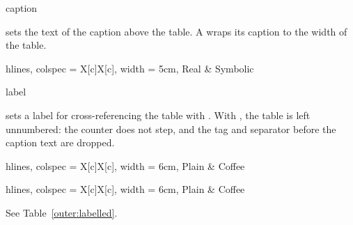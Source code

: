 \begin{codedescribe}[
        key,
        new=2021L
    ]{caption}
    \begin{codesyntax}
    \end{codesyntax}
     sets the text of the caption above the table. A  wraps its caption to the width of the table.

    \begin{codestore}[st=outer:caption]
        \begin{talltblr}[
            caption = {A caption, wrapped to the width of this narrow table},
            ]{
            hlines, colspec = {X[c]X[c]}, width = 5cm,
            }
            Real & Symbolic
        \end{talltblr}\end{codestore}
    \begin{center}
    \end{center}
\end{codedescribe}

\begin{codedescribe}[
        key,
        new=2021L
    ]{label}
    \begin{codesyntax}
    \end{codesyntax}
     sets a label for cross-referencing the table with . With , the table is left unnumbered: the  counter does not step, and the tag and separator before the caption text are dropped.

    \begin{codestore}[st=outer:label]
        \begin{talltblr}[
            caption = {Coffee without cream},
            label = {outer:labelled},
            ]{
            hlines, colspec = {X[c]X[c]}, width = 6cm,
            }
            Plain & Coffee
        \end{talltblr}\quad
        \begin{talltblr}[
            caption = {Coffee without milk},
            label = none,
            ]{
            hlines, colspec = {X[c]X[c]}, width = 6cm,
            }
            Plain & Coffee
        \end{talltblr}

        See Table~\ref{outer:labelled}.\end{codestore}
    \begin{center}
    \end{center}
\end{codedescribe}

